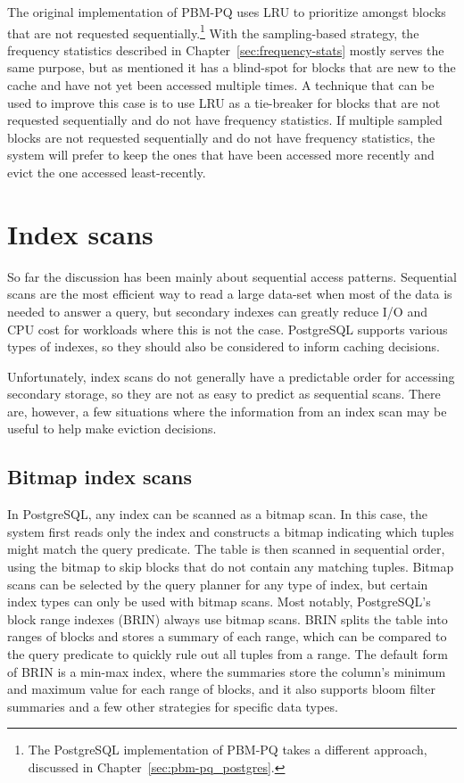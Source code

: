 The original implementation of PBM-PQ \cite{pbm} uses LRU to prioritize amongst blocks that are not requested sequentially.\footnote{The PostgreSQL implementation of PBM-PQ takes a different approach, discussed in Chapter~\ref{sec:pbm-pq_postgres}.} With the sampling-based strategy, the frequency statistics described in Chapter~\ref{sec:frequency-stats} mostly serves the same purpose, but as mentioned it has a blind-spot for blocks that are new to the cache and have not yet been accessed multiple times. A technique that can be used to improve this case is to use LRU as a tie-breaker for blocks that are not requested sequentially and do not have frequency statistics. If multiple sampled blocks are not requested sequentially and do not have frequency statistics, the system will prefer to keep the ones that have been accessed more recently and evict the one accessed least-recently. %


\section{\label{sec:index_scans}Index scans}

So far the discussion has been mainly about sequential access patterns. Sequential scans are the most efficient way to read a large data-set when most of the data is needed to answer a query, but secondary indexes can greatly reduce I/O and CPU cost for workloads where this is not the case. PostgreSQL supports various types of indexes, so they should also be considered to inform caching decisions.

Unfortunately, index scans do not generally have a predictable order for accessing secondary storage, so they are not as easy to predict as sequential scans. There are, however, a few situations where the information from an index scan may be useful to help make eviction decisions.

\subsection{\label{sec:bitmap_scans}Bitmap index scans}

In PostgreSQL, any index can be scanned as a bitmap scan. In this case, the system first reads only the index and constructs a bitmap indicating which tuples might match the query predicate. The table is then scanned in sequential order, using the bitmap to skip blocks that do not contain any matching tuples. Bitmap scans can be selected by the query planner for any type of index, but certain index types can only be used with bitmap scans. Most notably, PostgreSQL's block range indexes (BRIN) always use bitmap scans. BRIN splits the table into ranges of blocks and stores a summary of each range, which can be compared to the query predicate to quickly rule out all tuples from a range. The default form of BRIN is a min-max index, where the summaries store the column's minimum and maximum value for each range of blocks, and it also supports bloom filter summaries and a few other strategies for specific data types.

